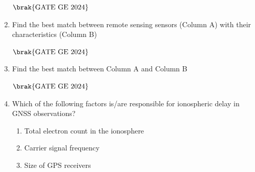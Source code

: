 \documentclass[journal,12pt,onecolumn]{IEEEtran}
\theoremstyle{remark}
\begin{document}
\begin{enumerate}
\begin{figure}[H]
    \label{figs:fig7}
\end{figure}
\begin{enumerate}
\end{enumerate}
\hfill $\brak{\text{GATE GE 2024}}$
\bigskip
\item Find the best match between remote sensing sensors (Column A) with their characteristics (Column B)
\begin{table}[h]
    \centering
    
\end{table}
\begin{enumerate}
\end{enumerate}
\hfill $\brak{\text{GATE GE 2024}}$
\bigskip
\item Find the best match between Column A and Column B
\begin{table}[h]
    \centering
    
\end{table}
\begin{enumerate}
\end{enumerate}
\hfill $\brak{\text{GATE GE 2024}}$
\bigskip
\item Which of the following factors is/are responsible for ionospheric delay in GNSS observations?
\begin{enumerate}
\item Total electron count in the ionosphere
\item Carrier signal frequency
\item Size of GPS receivers

\end{enumerate}
\end{enumerate}
\end{document}
